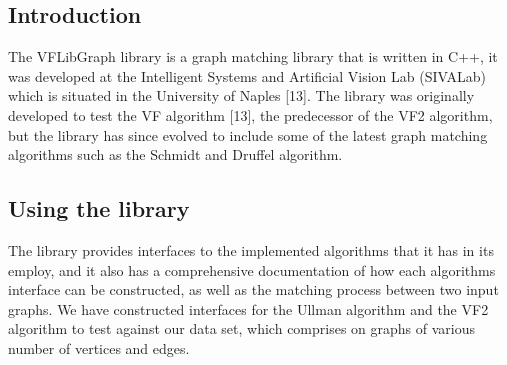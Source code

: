 \label{VFLibGraph Library}

\subsection{Introduction}
The VFLibGraph library is a graph matching library that is written in C++, it was developed at the Intelligent Systems and Artificial Vision Lab (SIVALab) which is situated in the University of Naples [13]. The library was originally developed to test the VF algorithm [13], the predecessor of the VF2 algorithm, but the library has since evolved to include some of the latest graph matching algorithms such as the Schmidt and Druffel algorithm.

\subsection{Using the library}
The library provides interfaces to the implemented algorithms that it has in its employ, and it also has a comprehensive documentation of how each algorithms interface can be constructed, as well as the matching process between two input graphs.\newline\newline
We have constructed interfaces for the Ullman algorithm and the VF2 algorithm to test against our data set, which comprises on graphs of various number of vertices and edges.
